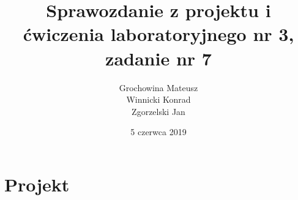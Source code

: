 \documentclass[a4paper,titlepage,11pt,twosides,floatssmall]{mwrep}
\begin{document}
\frenchspacing
\pagestyle{uheadings}

\title{\bf Sprawozdanie z projektu i ćwiczenia laboratoryjnego nr 3, zadanie nr 7\vskip 0.1cm}
\author{Grochowina Mateusz\\Winnicki Konrad\\Zgorzelski Jan}
\date{5 czerwca 2019}

\makeatletter
\renewcommand{\maketitle}{\begin{titlepage}
\begin{center}
{\LARGE {\bf Politechnika Warszawska}}\\
\vspace{0.4cm}
{\LARGE {\bf Wydział Elektroniki i Technik Informacyjnych}}\\
\vspace{0.2cm}
{\LARGE {\bf Instytut Automatyki i Informatyki Stosowanej}}\\
\end{center}
\vspace{5cm}
\begin{center}
{\bf \LARGE Projektowanie ukladów sterowania\\ (projekt grupowy) \vskip 0.1cm}
\end{center}
\vspace{1cm}
\begin{center}
{\bf \LARGE \@title}
\end{center}
\vspace{7cm}
{\bf Autorzy:\\ \Large \@author \par}
\vspace*{\stretch{6}}
\begin{center}
\bf{\large{Warszawa, \@date\vskip 0.1cm}}
\end{center}
\end{titlepage}
}
\makeatother


\tableofcontents
\chapter{Projekt}






\end{document}
